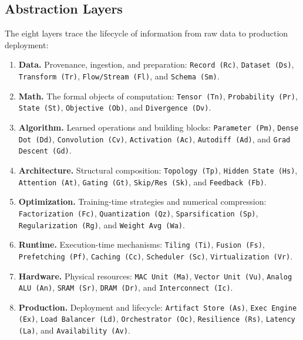 \documentclass[10pt,twocolumn]{article}
\begin{document}
\subsection{Abstraction Layers}

The eight layers trace the lifecycle of information from raw data to production deployment:

\begin{enumerate}[nosep, leftmargin=*]
\item \textbf{Data.} Provenance, ingestion, and preparation: \texttt{Record (Rc)}, \texttt{Dataset (Ds)}, \texttt{Transform (Tr)}, \texttt{Flow/Stream (Fl)}, and \texttt{Schema (Sm)}.
\item \textbf{Math.} The formal objects of computation: \texttt{Tensor (Tn)}, \texttt{Probability (Pr)}, \texttt{State (St)}, \texttt{Objective (Ob)}, and \texttt{Divergence (Dv)}.
\item \textbf{Algorithm.} Learned operations and building blocks: \texttt{Parameter (Pm)}, \texttt{Dense Dot (Dd)}, \texttt{Convolution (Cv)}, \texttt{Activation (Ac)}, \texttt{Autodiff (Ad)}, and \texttt{Grad Descent (Gd)}.
\item \textbf{Architecture.} Structural composition: \texttt{Topology (Tp)}, \texttt{Hidden State (Hs)}, \texttt{Attention (At)}, \texttt{Gating (Gt)}, \texttt{Skip/Res (Sk)}, and \texttt{Feedback (Fb)}.
\item \textbf{Optimization.} Training-time strategies and numerical compression: \texttt{Factorization (Fc)}, \texttt{Quantization (Qz)}, \texttt{Sparsification (Sp)}, \texttt{Regularization (Rg)}, and \texttt{Weight Avg (Wa)}.
\item \textbf{Runtime.} Execution-time mechanisms: \texttt{Tiling (Ti)}, \texttt{Fusion (Fs)}, \texttt{Prefetching (Pf)}, \texttt{Caching (Cc)}, \texttt{Scheduler (Sc)}, \texttt{Virtualization (Vr)}.
\item \textbf{Hardware.} Physical resources: \texttt{MAC Unit (Ma)}, \texttt{Vector Unit (Vu)}, \texttt{Analog ALU (An)}, \texttt{SRAM (Sr)}, \texttt{DRAM (Dr)}, and \texttt{Interconnect (Ic)}.
\item \textbf{Production.} Deployment and lifecycle: \texttt{Artifact Store (As)}, \texttt{Exec Engine (Ex)}, \texttt{Load Balancer (Ld)}, \texttt{Orchestrator (Oc)}, \texttt{Resilience (Rs)}, \texttt{Latency (La)}, and \texttt{Availability (Av)}.
\end{enumerate}
\end{document}

